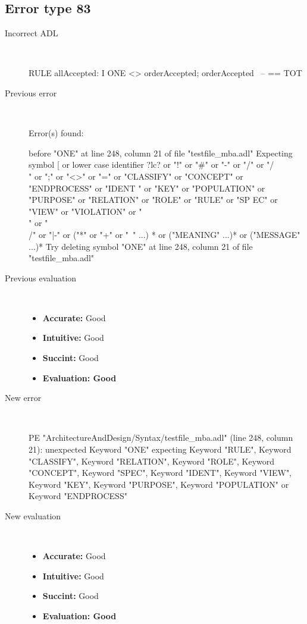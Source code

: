 \subsection{Error type 83}
  \begin{description}
  \item[Incorrect ADL]~\\
\begin{adl}
RULE allAccepted: I ONE <> orderAccepted; orderAccepted~ -- == TOT\end{adl}
  \item[Previous error]~\\
\begin{haskell}
Error(s) found:

before "ONE" at line 248, column 21 of file "testfile_mba.adl"
Expecting symbol [ or lower case identifier ?lc? or "!" or "#" or "-" or "/" or
"/\\" or ";" or "<>" or "=" or "CLASSIFY" or "CONCEPT" or "ENDPROCESS" or "IDENT
" or "KEY" or "POPULATION" or "PURPOSE" or "RELATION" or "ROLE" or "RULE" or "SP
EC" or "VIEW" or "VIOLATION" or "\\" or "\\/" or "|-" or ("*" or "+" or "~" ...)
* or ("MEANING" ...)* or ("MESSAGE" ...)*
Try deleting symbol "ONE" at line 248, column 21 of file "testfile_mba.adl"

\end{haskell}
  \item[Previous evaluation]~\\
    \begin{itemize}
    \item \textbf{Accurate:} Good
    \item \textbf{Intuitive:} Good
    \item \textbf{Succint:} Good
    \item \textbf{Evaluation: Good}
    \end{itemize}
  \item[New error]~\\
\begin{haskell}
PE "ArchitectureAndDesign/Syntax/testfile_mba.adl" (line 248, column 21):
unexpected Keyword "ONE"
expecting Keyword "RULE", Keyword "CLASSIFY", Keyword "RELATION", Keyword "ROLE", Keyword "CONCEPT", Keyword "SPEC", Keyword "IDENT", Keyword "VIEW", Keyword "KEY", Keyword "PURPOSE", Keyword "POPULATION" or Keyword "ENDPROCESS"
\end{haskell}
  \item[New evaluation]~\\
    \begin{itemize}
    \item \textbf{Accurate:} Good
    \item \textbf{Intuitive:} Good
    \item \textbf{Succint:} Good
    \item \textbf{Evaluation: Good
}
    \end{itemize}
  \end{description}


